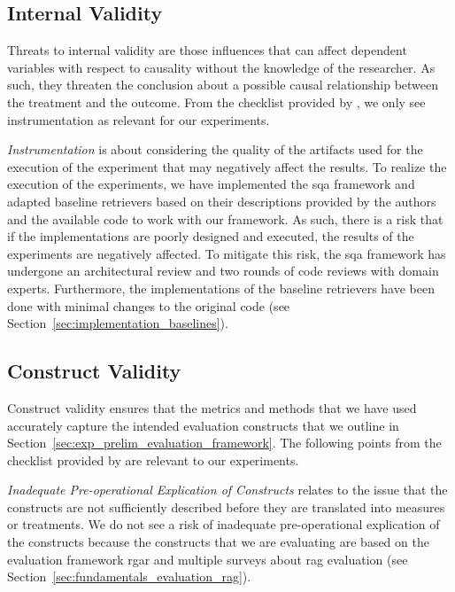 \subsection{Internal Validity}

Threats to internal validity are those influences that can affect dependent variables with respect to causality without the knowledge of the researcher. As such, they threaten the conclusion about a possible causal relationship between the treatment and the outcome. From the checklist provided by \textcite[133-134]{wohlin_experimentation_2024}, we only see instrumentation as relevant for our experiments.

\emph{Instrumentation} is about considering the quality of the artifacts used for the execution of the experiment that may negatively affect the results. To realize the execution of the experiments, we have implemented the \gls{sqa} framework and adapted baseline retrievers based on their descriptions provided by the authors and the available code to work with our framework. As such, there is a risk that if the implementations are poorly designed and executed, the results of the experiments are negatively affected. To mitigate this risk, the \gls{sqa} framework has undergone an architectural review and two rounds of code reviews with domain experts. Furthermore, the implementations of the baseline retrievers have been done with minimal changes to the original code (see Section~\ref{sec:implementation_baselines}).

\subsection{Construct Validity}
Construct validity ensures that the metrics and methods that we have used accurately capture the intended evaluation constructs that we outline in Section~\ref{sec:exp_prelim_evaluation_framework}. The following points from the checklist provided by \textcite[146-137]{wohlin_experimentation_2024} are relevant to our experiments.

\emph{Inadequate Pre-operational Explication of Constructs} relates to the issue that the constructs are not sufficiently described before they are translated into measures or treatments. We do not see a risk of inadequate pre-operational explication of the constructs because the constructs that we are evaluating are based on the evaluation framework \gls{rgar} \cite{yu_evaluation_2024} and multiple surveys about \gls{rag} evaluation (see Section~\ref{sec:fundamentals_evaluation_rag}).

